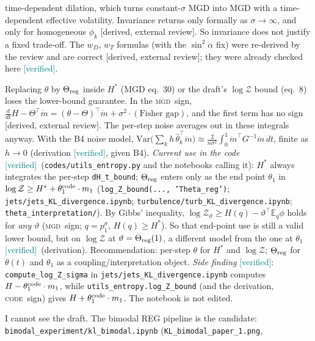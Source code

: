 \documentclass[11pt,a4paper]{article}
\newcommand{\code}[1]{\texttt{#1}}
\newcommand{\ver}{\textcolor{teal}{\textsf{[verified]}}}
\newcommand{\ext}{\textcolor{purple!80!black}{\textsf{[derived, external review]}}}
\newcommand{\E}{\mathbb{E}}
\newcommand{\MGD}{\textsc{mgd}}
\newcommand{\cs}{\textsc{code}}
\begin{document}
\begin{description}[leftmargin=1.2em,style=nextline]
  time-dependent dilation, which turns constant-$\sigma$ MGD into MGD with a time-dependent effective volatility. Invariance
  returns only formally as $\sigma\to\infty$, and only for homogeneous $\phi_k$ \ext. So invariance does not justify a fixed trade-off.
  The $w_D$, $w_T$ formulas (with the $\sin^2\alpha$ fix) were re-derived by the review and are correct \ext; they were already checked here \ver.
\item[A7. Entropy and $\log\mathcal Z$: keep the per-step $\theta$.]
  Replacing $\theta$ by $\Theta_{\rm reg}$ inside $H^*$ (MGD eq.~30) or the draft's $\log\mathcal Z$ bound (eq.~8) loses the lower-bound guarantee.
  In the \MGD\ sign, $\frac{d}{dt}H-\Theta^\top\dot m=(\theta-\Theta)^\top\dot m+\sigma^2\cdot(\text{Fisher gap})$, and the first term has no sign \ext.
  The per-step noise averages out in these integrals anyway. With the B4 noise model,
  $\mathrm{Var}\big(\sum_kh\,\hat\theta_k^\top\dot m\big)\approx\frac{2}{n\sigma^2}\int_0^1\dot m^\top G^{-1}\dot m\,dt$, finite as $h\to0$
  (derivation \ver, given B4).\newline
  \emph{Current use in the code} \ver\ (\code{codes/utils\_entropy.py} and the notebooks calling it): $H^*$ always integrates the per-step
  \code{dH\_t\_bound}; $\Theta_{\rm reg}$ enters only as the end point $\theta_1$ in $\log\mathcal Z\ge H^*+\theta_1^{\rm code}\cdot m_1$
  (\code{log\_Z\_bound(..., 'Theta\_reg')}; \code{jets/jets\_KL\_divergence.ipynb}; \code{turbulence/turb\_KL\_divergence.ipynb};
  \code{theta\_interpretation/}). By Gibbs' inequality, $\log\mathcal Z_\vartheta\ge H(q)-\vartheta^\top\E_q\phi$ holds for \emph{any} $\vartheta$
  (\MGD\ sign; $q=p^\sigma_1$, $H(q)\ge H^*$). So that end-point use is still a valid lower bound, but on $\log\mathcal Z$ at $\vartheta=\Theta_{\rm reg}(1)$,
  a different model from the one at $\theta_1$ \ver\ (derivation). Recommendation: per-step $\theta$ for $H^*$ and $\log\mathcal Z$;
  $\Theta_{\rm reg}$ for $\theta(t)$ and $\theta_1$ as a coupling/interpretation object.\newline
  \emph{Side finding} \ver: \code{compute\_log\_Z\_sigma} in \code{jets/jets\_KL\_divergence.ipynb} computes $H-\theta_1^{\rm code}\cdot m_1$, while
  \code{utils\_entropy.log\_Z\_bound} (and the derivation, \cs\ sign) gives $H+\theta_1^{\rm code}\cdot m_1$. The notebook is not edited.
\item[A8. Draft Fig.~1 (``regularised MGD, 2 orders of magnitude''): flagged for re-run.]
  I cannot see the draft. The bimodal REG pipeline is the candidate: \code{bimodal\_experiment/kl\_bimodal.ipynb} (\code{KL\_bimodal\_paper\_1.png},

\end{description}
\end{document}
